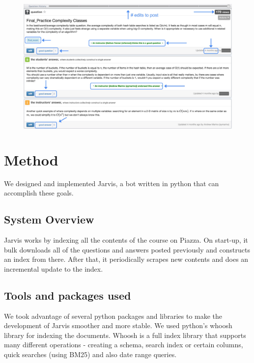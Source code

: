 \documentclass[sigconf]{acmart}
\begin{document}
\begin{figure}
\includegraphics[width=\textwidth]{piazza_stats}
\end{figure}

\section{Method}
We designed and implemented Jarvis, a bot written in python that can accomplish these goals. 

\subsection{System Overview}
Jarvis works by indexing all the contents of the course on Piazza. On start-up, it bulk downloads all of the questions and answers posted previously and constructs an index from there. After that, it periodically scrapes new contents and does an incremental update to the index.

\subsection{Tools and packages used}
We took advantage of several python packages and libraries to make the development of Jarvis smoother and more stable. We used python's whoosh library for indexing the documents. Whoosh is a full index library that supports many different operations - creating a schema, search index or certain columns, quick searches (using BM25) and also date range queries. 
\end{document}
